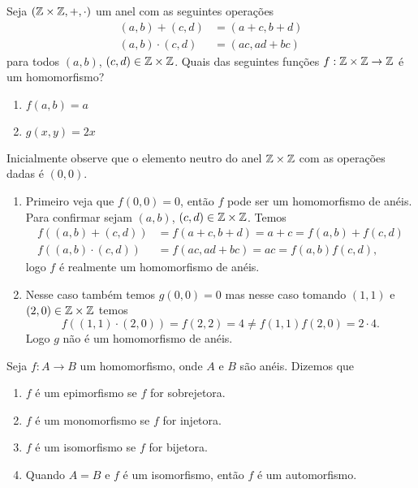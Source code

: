 \begin{exemplo}
    Seja $(\mathbb{Z}\times\mathbb{Z}, +, \cdot)$ um anel com as seguintes opera\c{c}\~oes
    \begin{align*}
        (a, b) + (c, d) &= (a + c, b + d)\\
        (a, b)\cdot (c, d) &= (ac, ad + bc)
    \end{align*}
    para todos $(a, b)$, $(c, d) \in \mathbb{Z}\times\mathbb{Z}$.
    Quais das seguintes funções $f : \mathbb{Z}\times\mathbb{Z} \to \mathbb{Z}$ \'e um homomorfismo?
    \begin{enumerate}[label={\alph*})]
        \item $f(a, b) = a$

        \item $g(x, y) = 2x$
    \end{enumerate}
    \begin{solucao}
        Inicialmente observe que o elemento neutro do anel $\mathbb{Z} \times \mathbb{Z}$ com as operações dadas é $(0, 0)$.
        \begin{enumerate}[label={\alph*})]
            \item Primeiro veja que $f(0, 0) = 0$, então $f$ pode ser um homomorfismo de anéis. Para confirmar sejam $(a, b)$, $(c, d) \in \mathbb{Z} \times \mathbb{Z}$. Temos
                \begin{align*}
                    f((a, b) + (c, d)) &= f(a + c, b + d) = a + c = f(a, b) + f(c, d)\\
                    f((a, b) \cdot (c, d)) &= f(ac, ad + bc) = ac = f(a, b)f(c, d),
                \end{align*}
                logo $f$ é realmente um homomorfismo de anéis.

            \item Nesse caso também temos $g(0, 0) = 0$ mas nesse caso tomando $(1, 1)$ e $(2,0) \in \mathbb{Z} \times \mathbb{Z}$ temos
                \[
                    f((1, 1) \cdot (2, 0)) = f(2, 2) = 4 \ne f(1,1)f(2,0)=2\cdot 4.
                \]
                Logo $g$ não é um homomorfismo de anéis.
        \end{enumerate}
    \end{solucao}
\end{exemplo}


\begin{definicao}Seja $f:A\rightarrow B$ um homomorfismo, onde $A$ e $B$ s{\~a}o an{\'e}is. Dizemos que
	\begin{enumerate}[label={\roman*})]
		\item $f$ {\'e} um epimorfismo se $f$ for sobrejetora.
		\item $f$ {\'e} um monomorfismo se $f$ for injetora.
		\item $f$ {\'e} um isomorfismo se $f$ for bijetora.
		\item Quando $A=B$ e $f$ {\'e} um isomorfismo, ent{\~a}o $f$ {\'e} um automorfismo.
	\end{enumerate}
\end{definicao}

